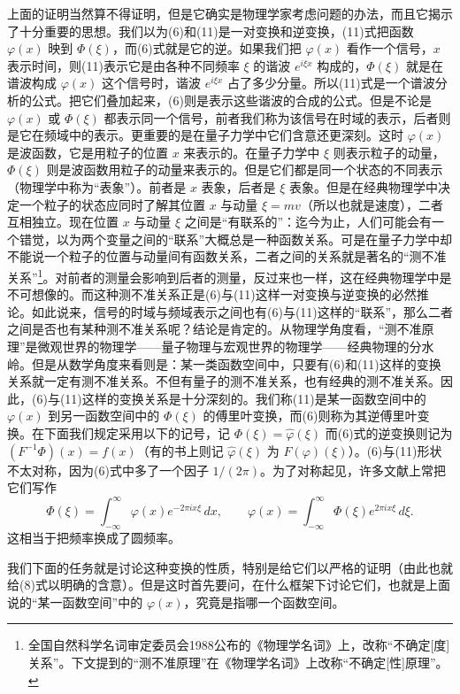 上面的证明当然算不得证明，但是它确实是物理学家考虑问题的办法，而且它揭示了十分重要的思想。我们以为(6)和(11)是一对变换和逆变换，(11)式把函数 $\varphi(x)$ 映到 $\Phi(\xi)$，而(6)式就是它的逆。如果我们把 $\varphi(x)$ 看作一个信号，$x$ 表示时间，则(11)表示它是由各种不同频率 $\xi$ 的谐波 $e^{i\xi x}$ 构成的，$\Phi(\xi)$ 就是在谱波构成 $\varphi(x)$ 这个信号时，谐波 $e^{i\xi x}$ 占了多少分量。所以(11)式是一个谱波分析的公式。把它们叠加起来，(6)则是表示这些谐波的合成的公式。但是不论是 $\varphi(x)$ 或 $\Phi(\xi)$ 都表示同一个信号，前者我们称为该信号在时域的表示，后者则是它在频域中的表示。更重要的是在量子力学中它们含意还更深刻。这时 $\varphi(x)$ 是波函数，它是用粒子的位置 $x$ 来表示的。在量子力学中 $\xi$ 则表示粒子的动量，$\Phi(\xi)$ 则是波函数用粒子的动量来表示的。但是它们都是同一个状态的不同表示（物理学中称为“表象”）。前者是 $x$ 表象，后者是 $\xi$ 表象。但是在经典物理学中决定一个粒子的状态应同时了解其位置 $x$ 与动量 $\xi=mv$（所以也就是速度），二者互相独立。现在位置 $x$ 与动量 $\xi$ 之间是“有联系的”：迄今为止，人们可能会有一个错觉，以为两个变量之间的“联系”大概总是一种函数关系。可是在量子力学中却不能说一个粒子的位置与动量间有函数关系，二者之间的关系就是著名的“测不准关系”\footnote{全国自然科学名词审定委员会1988公布的《物理学名词》上，改称“不确定[度]关系”。下文提到的“测不准原理”在《物理学名词》上改称“不确定[性]原理”。}。对前者的测量会影响到后者的测量，反过来也一样，这在经典物理学中是不可想像的。而这种测不准关系正是(6)与(11)这样一对变换与逆变换的必然推论。如此说来，信号的时域与频域表示之间也有(6)与(11)这样的“联系”，那么二者之间是否也有某种测不准关系呢？结论是肯定的。从物理学角度看，“测不准原理”是微观世界的物理学——量子物理与宏观世界的物理学——经典物理的分水岭。但是从数学角度来看则是：某一类函数空间中，只要有(6)和(11)这样的变换关系就一定有测不准关系。不但有量子的测不准关系，也有经典的测不准关系。因此，(6)与(11)这样的变换关系是十分深刻的。我们称(11)是某一函数空间中的 $\varphi(x)$ 到另一函数空间中的 $\Phi(\xi)$ 的傅里叶变换，而(6)则称为其逆傅里叶变换。在下面我们规定采用以下的记号，记 $\Phi(\xi)=\widehat\varphi(\xi)$ 而(6)式的逆变换则记为 $(F^{-1}\Phi)(x)=f(x)$（有的书上则记 $\widehat\varphi(\xi)$ 为 $F(\varphi)(\xi)$）。(6)与(11)形状不太对称，因为(6)式中多了一个因子 $1/(2\pi)$。为了对称起见，许多文献上常把它们写作
\[
 \Phi(\xi)=\int_{-\infty}^{\infty}\varphi(x)e^{-2\pi i x\xi}\,dx,
 \qquad
 \varphi(x)=\int_{-\infty}^{\infty}\Phi(\xi)e^{2\pi i x\xi}\,d\xi.
\]
这相当于把频率换成了圆频率。

我们下面的任务就是讨论这种变换的性质，特别是给它们以严格的证明（由此也就给(8)式以明确的含意）。但是这时首先要问，在什么框架下讨论它们，也就是上面说的“某一函数空间”中的 $\varphi(x)$，究竟是指哪一个函数空间。


